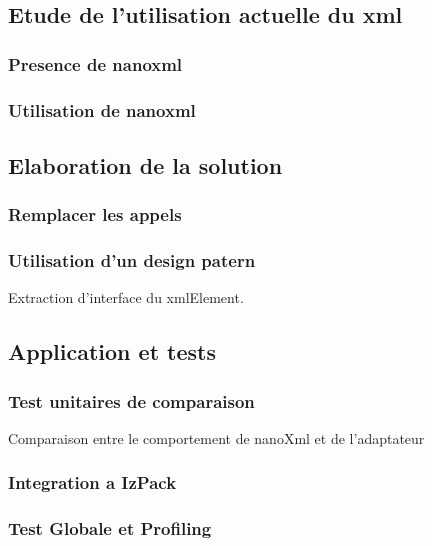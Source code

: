 \subsection{Etude de l'utilisation actuelle du xml}
\subsubsection{Presence de nanoxml}
\subsubsection{Utilisation de nanoxml}
\subsection{Elaboration de la solution}
\subsubsection{Remplacer les appels}
\subsubsection{Utilisation d'un design patern}
Extraction d'interface du xmlElement.

\subsection{Application et tests}
\subsubsection{Test unitaires de comparaison}
Comparaison entre le comportement de nanoXml et de l'adaptateur
\subsubsection{Integration a IzPack}
\subsubsection{Test Globale et Profiling}


